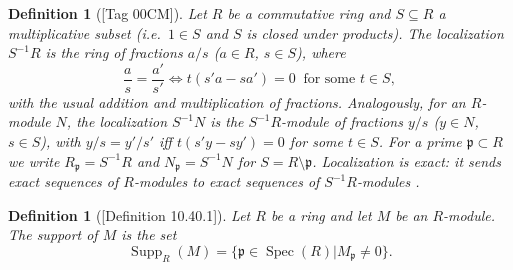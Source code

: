\documentclass[pdflatex,sn-mathphys-num]{sn-jnl}
\numberwithin{equation}{section}
\theoremstyle{thmstyleone}
\newtheorem{definition}[theorem]{Definition}
\theoremstyle{thmstyletwo}
\newcommand{\Spec}{\operatorname{Spec}}
\newcommand{\Supp}{\operatorname{Supp}}
\begin{document}
\begin{definition}[{\cite{Stacks}[Tag 00CM]}] \label{def:localization}
Let $R$ be a commutative ring and $S\subseteq R$ a multiplicative subset
(i.e.\ $1\in S$ and $S$ is closed under products). The \emph{localization}
$S^{-1}R$ is the ring of fractions $a/s$ ($a\in R$, $s\in S$), where
\[ \frac{a}{s}=\frac{a'}{s'}\iff t(s'a-sa')=0\ \text{ for some }t\in S,\]
with the usual addition and multiplication of fractions. Analogously, for an $R$-module
$N$, the \emph{localization} $S^{-1}N$ is the $S^{-1}R$-module of fractions
$y/s$ ($y\in N$, $s\in S$), with $y/s=y'/s'$ iff $t(s'y-sy')=0$ for some
$t\in S$. For a prime $\mathfrak p\subset R$ we write
$R_{\mathfrak p}=S^{-1}R$ and $N_{\mathfrak p}=S^{-1}N$ for
$S=R\setminus\mathfrak p$. Localization is exact: it sends exact sequences
of $R$-modules to exact sequences of $S^{-1}R$-modules \cite[Tag 00CS]{Stacks}.
\end{definition}
\begin{definition}[{\cite{Stacks}[Definition 10.40.1]}]\label{def:supp}
    Let $R$ be a ring and let $M$ be an $R$-module. The \emph{support} of $M$ is the set 
    \[\Supp_R(M) = \{\mathfrak{p} \in \Spec(R) | M_{\mathfrak{p}} \neq 0\}.\]
\end{definition}
\end{document}
